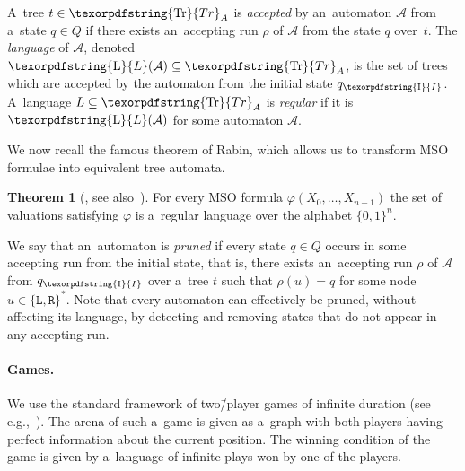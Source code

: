 \documentclass[11pt,a4paper]{amsart}
\theoremstyle{plain}
\theoremstyle{definition}
\theoremstyle{defC}
\theoremstyle{thmC}
\newtheorem{thmC}[thm]{Theorem}
\theoremstyle{plain}
\numberwithin{equation}{section}
\numberwithin{equation}{section}
\numberwithin{figure}{section}
\newcommand{\ident}[1]{\ensuremath{\texorpdfstring{\mathrm{\mathnm{#1}}}{#1}}\xspace}
\newcommand{\mathcalsym}[1]{\ensuremath{\mathcal{#1}}\xspace}
\newcommand{\CA}{\mathcalsym{A}}
\newcommand{\lang}{\ident{L}}
\newcommand{\dL}{\mathtt{{\scriptstyle L}}}
\newcommand{\dR}{\mathtt{{\scriptstyle R}}}
\newcommand{\mathnm}[1]{#1}
\newcommand{\init}{\ident{I}}
\newcommand{\trees}{\ident{Tr}}
\renewcommand\phi\varphi
\begin{document}
A~tree $t\in\trees_A$ is \emph{accepted} by an~automaton $\CA$ from a~state $q\in Q$ if there exists an~accepting run $\rho$ of $\CA$ from the state $q$ over~$t$.
The \emph{language} of $\CA$, denoted $\lang(\CA)\subseteq\trees_A$, is the set of trees which are accepted by the automaton from the initial state $q_\init$.
A~language $L\subseteq\trees_A$ is \emph{regular} if it is $\lang(\CA)$ for some automaton $\CA$.

We now recall the famous theorem of Rabin, which allows us to transform MSO formulae into equivalent tree automata.

\begin{thmC}[\cite{rabin_s2s}, see also~\cite{thomas_languages}]
	For every MSO formula $\phi(X_0,\ldots,X_{n-1})$ the set of valuations satisfying $\phi$ is a~regular language over the alphabet $\{0,1\}^n$.
\end{thmC}
\noindent %
We say that an~automaton is \emph{pruned} if every state $q\in Q$ occurs in some accepting run from the initial state, that is,
there exists an~accepting run $\rho$ of $\CA$ from $q_{\init}$ over a~tree $t$ such that $\rho(u)=q$ for some node $u\in\{\dL,\dR\}^\ast$.
Note that every automaton can effectively be pruned, without affecting its language, by detecting and removing states that do not appear in any accepting run.


\paragraph*{Games.}
We use the standard framework of two\=/player games of infinite duration (see e.g.,~\cite{buchi_synthesis,fijalkow_games}).
The arena of such a~game is given as a~graph with both players having perfect information about the current position.
The winning condition of the game is given by a~language of infinite plays won by one of the players.
\end{document}
